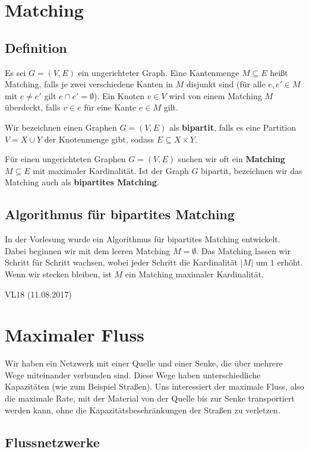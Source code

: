 \documentclass[12pt]{article}
\begin{document}
\section{Matching}

\subsection{Definition}

Es sei $G = (V, E)$ ein ungerichteter Graph. Eine Kantenmenge $M \subseteq E$ heißt Matching, falls je zwei verschiedene Kanten in $M$ disjunkt sind (für alle $e, e' \in M$ mit $e \neq e'$ gilt $e \cap e' = \emptyset$). Ein Knoten $v \in V$ wird von einem Matching $M$ überdeckt, falls $v \in e$ für eine Kante $e \in M$ gilt.

Wir bezeichnen einen Graphen $G = (V, E)$ als \textbf{bipartit}, falls es eine Partition $V = X \cup Y$ der Knotenmenge gibt, sodass $E \subseteq X \times Y$.

Für einen ungerichteten Graphen $G = (V, E)$ suchen wir oft ein \textbf{Matching} $M \subseteq E$ mit maximaler Kardinalität. Ist der Graph $G$ bipartit, bezeichnen wir das Matching auch als \textbf{bipartites Matching}.

\subsection{Algorithmus für bipartites Matching}

In der Vorlesung wurde ein Algorithmus für bipartites Matching entwickelt. Dabei beginnen wir mit dem leeren Matching $M = \emptyset$. Das Matching lassen wir Schritt für Schritt wachsen, wobei jeder Schritt die Kardinalität $|M|$ um $1$ erhöht. Wenn wir stecken bleiben, ist $M$ ein Matching maximaler Kardinalität.

VL18 (11.08.2017)

\section{Maximaler Fluss}

Wir haben ein Netzwerk mit einer Quelle und einer Senke, die über mehrere Wege miteinander verbunden sind. Diese Wege haben unterschiedliche Kapazitäten (wie zum Beispiel Straßen). Uns interessiert der maximale Fluss, also die maximale Rate, mit der Material von der Quelle bis zur Senke transportiert werden kann, ohne die Kapazitätsbeschränkungen der Straßen zu verletzen.

\subsection{Flussnetzwerke}
\end{document}
